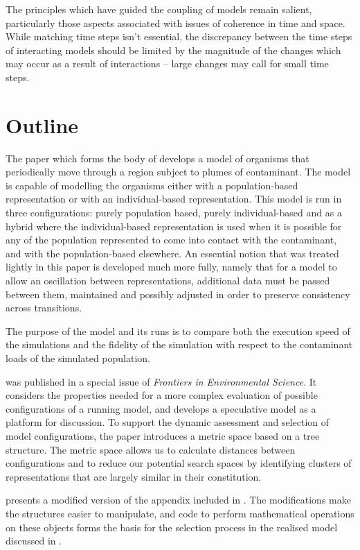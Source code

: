 The principles which have guided the coupling of models remain
salient, particularly those aspects associated with issues of
coherence in time and space. While matching time steps isn't essential,
the discrepancy between the time steps of interacting models should be
limited by the magnitude of the changes which may occur as a result of
interactions -- large changes may call for small time steps.

\section{Outline}
The paper which forms the body of \Ctwo
develops a model of organisms that periodically move through a region
subject to plumes of contaminant.  The model is capable of modelling
the organisms either with a population-based representation or with an
individual-based representation.  This model is run in three
configurations: purely population based, purely individual-based and
as a hybrid where the individual-based representation is used when it
is possible for any of the population represented to come into contact
with the contaminant, and with the population-based elsewhere. An
essential notion that was treated lightly in this paper is developed
much more fully, namely that for a model to allow an oscillation
between representations, additional data must be passed between them,
maintained and possibly adjusted in order to preserve consistency
across transitions.

The purpose of the model and its runs is to compare both the execution
speed of the simulations and the fidelity of the simulation with
respect to the contaminant loads of the simulated population.

\Cthree was published in a special issue
of \emph{Frontiers in Environmental Science\/}. It considers the 
properties needed for a more complex evaluation of possible
configurations of a running model, and develops a speculative model as
a platform for discussion.  To support the dynamic assessment and
selection of model configurations, the paper introduces a metric space
based on a tree structure. The metric space allows us to calculate
distances between configurations and to reduce our potential search
spaces by identifying clusters of representations that are largely
similar in their constitution.

\Cfour presents a modified version of the appendix included
in \Cthree. The modifications make the structures easier to manipulate,
and code to perform mathematical operations on these objects forms
the basis for the selection process in the realised model discussed
in \Cfive. 

